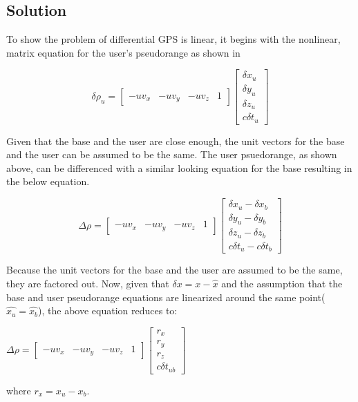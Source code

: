 \documentclass{article}
\begin{document}
\subsection*{Solution}

To show the problem of differential GPS is linear, it begins with the nonlinear, matrix equation for the user's pseudorange as shown in 

\begin{equation}
    \delta\rho_u = \begin{bmatrix}
        -uv_x & -uv_y & -uv_z & 1
        \end{bmatrix}\begin{bmatrix}
        \delta x_u\\\delta y_u\\\delta z_u\\c\delta t_u
        \end{bmatrix}\label{eq:psr_mat}
\end{equation}

Given that the base and the user are close enough, the unit vectors for the base and the user can be assumed to be the same.  
The user psuedorange, as shown above, can be differenced with a similar looking equation for the base resulting in the below equation.

\begin{equation}
    \Delta\rho = \begin{bmatrix}
        -uv_x & -uv_y & -uv_z & 1
        \end{bmatrix}\begin{bmatrix}
        \delta x_u - \delta x_b\\\delta y_u - \delta y_b\\\delta z_u - \delta z_b\\c\delta t_u - c\delta t_b
        \end{bmatrix}\label{eq:del_psr_mat}
\end{equation}

Because the unit vectors for the base and the user are assumed to be the same, they are factored out.  Now, given that $\delta x = x - \hat{x}$ and the assumption that the base and user 
pseudorange equations are linearized around the same point($\hat{x_u} = \hat{x_b}$), the above equation reduces to:

\begin{center}
$\Delta\rho=\begin{bmatrix}
    -uv_x & -uv_y & -uv_z & 1
    \end{bmatrix}\begin{bmatrix}
    r_x\\r_y\\r_z\\c\delta t_{ub}
    \end{bmatrix}$
\end{center}
where $r_x = x_u - x_b$.
\end{document}
